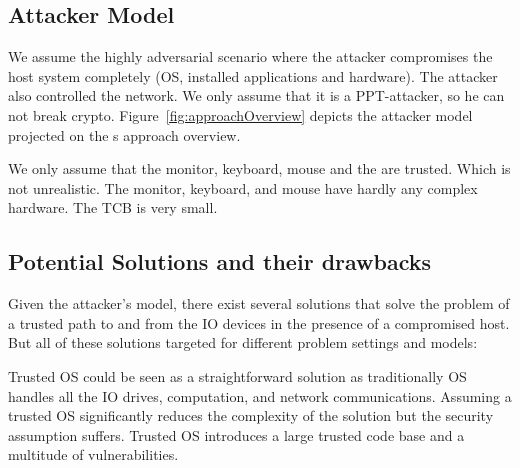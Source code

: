 \subsection{Attacker Model}

We assume the highly adversarial scenario where the attacker compromises the host system completely (OS, installed applications and hardware). The attacker also controlled the network. We only assume that it is a PPT-attacker, so he can not break crypto. Figure~\ref{fig:approachOverview} depicts the attacker model projected on the \name{}s approach overview.

We only assume that the monitor, keyboard, mouse and the \device are trusted. Which is not unrealistic. The monitor, keyboard, and mouse have hardly any complex hardware. The TCB is very small.

\iffalse
\myparagraph{Advantages}

\begin{enumerate}
  \item The \device does not need to know the formatting/template of the page. As the \device only looks to the current mouse position, the structure of the page is somewhat irrelevant (?).
\end{enumerate}
\fi


\subsection{Potential Solutions and their drawbacks}

Given the attacker's model, there exist several solutions that solve the problem of a trusted path to and from the IO devices in the presence of a compromised host. But all of these solutions targeted for different problem settings and models:

 Trusted OS could be seen as a straightforward solution as traditionally OS handles all the IO drives, computation, and network communications. Assuming a trusted OS significantly reduces the complexity of the solution but the security assumption suffers. Trusted OS introduces a large trusted code base and a multitude of vulnerabilities. 

